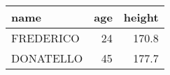 \begin{tabular}{lrr}
\toprule
name & age & height \\
\midrule
FREDERICO & 24 & 170.8 \\
DONATELLO & 45 & 177.7 \\
\bottomrule
\end{tabular}
